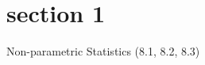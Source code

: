 \documentclass{article}
\begin{document}
    \section{section 1}
    Non-parametric Statistics (8.1, 8.2, 8.3)
\end{document}
